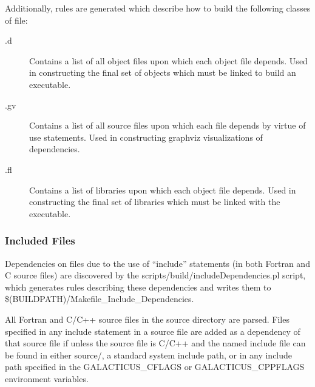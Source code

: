 Additionally, rules are generated which describe how to build the following classes of file:
\begin{description}
\item[{\normalfont \ttfamily *.d}] Contains a list of all object files upon which each object file depends. Used in constructing the final set of objects which must be linked to build an executable.
\item[{\normalfont \ttfamily *.gv}] Contains a list of all source files upon which each file depends by virtue of {\normalfont \ttfamily use} statements. Used in constructing \gls{graphviz} visualizations of dependencies.
\item[{\normalfont \ttfamily *.fl}] Contains a list of libraries upon which each object file depends. Used in constructing the final set of libraries which must be linked with the executable.
\end{description}

\subsubsection{Included Files}\label{sec:buildIncludeDeps}

Dependencies on files due to the use of ``{\normalfont \ttfamily include}'' statements (in both Fortran and C source files) are discovered by the {\normalfont \ttfamily scripts/build/includeDependencies.pl} script, which generates rules describing these dependencies and writes them to {\normalfont \ttfamily \$(BUILDPATH)/Makefile\_Include\_Dependencies}.

All Fortran and C/C++ source files in the {\normalfont \ttfamily source} directory are parsed. Files specified in any include statement in a source file are added as a dependency of that source file if unless the source file is C/C++ and the named include file can be found in either {\normalfont \ttfamily source/}, a standard system include path, or in any include path specified in the {\normalfont \ttfamily GALACTICUS\_CFLAGS} or {\normalfont \ttfamily GALACTICUS\_CPPFLAGS} environment variables.

